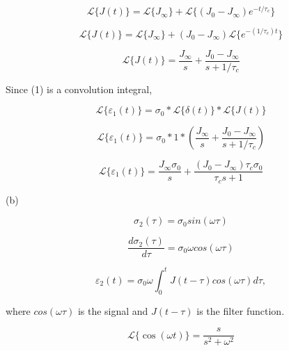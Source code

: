 \documentclass[preprint,12pt,authoryear]{elsarticle}
\begin{document}
\begin{equation*}
     \mathcal{L}\{J(t)\} = \mathcal{L}\{J_\infty\} + \mathcal{L}\{(J_0-J_\infty)e^{-t/\tau_c}\}
\end{equation*}

\begin{equation*}
    \mathcal{L}\{J(t)\} = \mathcal{L}\{J_\infty\} + (J_0-J_\infty)\mathcal{L}\{e^{-(1/\tau_c)t}\}
\end{equation*}

\begin{equation*}
    \mathcal{L}\{J(t)\} = \frac{J_\infty}{s} + \frac{J_0-J_\infty}{s+1/\tau_c}
\end{equation*}

\bigskip

Since (1) is a convolution integral,

\begin{equation*}
    \mathcal{L}\{\varepsilon_1(t)\} = \sigma_0*\mathcal{L}\{\delta(t)\}*\mathcal{L}\{J(t)\}
\end{equation*}

\begin{equation*}
    \mathcal{L}\{\varepsilon_1(t)\} = \sigma_0*1*(\frac{J_\infty}{s} + \frac{J_0-J_\infty}{s+1/\tau_c})
\end{equation*}

\begin{equation*}
    \mathcal{L}\{\varepsilon_1(t)\} = \frac{J_\infty\sigma_0}{s} + \frac{(J_0-J_\infty)\tau_c\sigma_0}{\tau_cs+1}
\end{equation*}

\newpage


(b)

\begin{equation*}
    \sigma_2(\tau) = \sigma_0 sin(\omega \tau)
\end{equation*}

\begin{equation*}
    \frac{d\sigma_2(\tau)}{d\tau} = \sigma_0 \omega cos(\omega \tau)
\end{equation*}

\begin{equation}
    \varepsilon_2(t) = \sigma_0 \omega \int_0^t J(t-\tau) cos(\omega \tau) d\tau,
\end{equation}

where $cos(\omega \tau)$ is the signal and $J(t-\tau)$ is the filter function.

\bigskip

\begin{equation*}
    \mathcal{L}\{\cos(\omega t)\} = \frac{s}{s^2+\omega^2}
\end{equation*}
\end{document}
